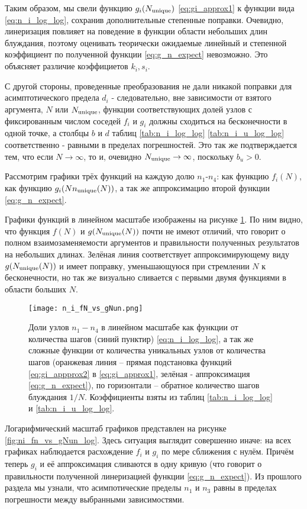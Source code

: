 Таким образом, мы свели функцию $g_i(N_{\textup{unique}})$ \eqref{eq:gi_approx1} к функции вида \eqref{eq:n_i_log_log}, сохранив дополнительные степенные поправки. 
Очевидно, линеризация повлияет на поведение в функции области небольших длин блуждания, поэтому оценивать теорически ожидаемые линейный и степенной коэффициент по полученной функции \eqref{eq:g_n_expect} невозможно.
Это объясняет различие коэффициетов $k_i, s_i$. 

С другой стороны, проведенные преобразования не дали никакой поправки для асимптотического предела $d_i$ - следовательно, вне зависимости от взятого аргумента, $N$ или $N_{\textup{unique}}$, функции соответствующих долей узлов с фиксированным числом соседей $f_i$ и $g_i$ должны сходиться на бесконечности в одной точке, а столбцы $b$ и $d$ таблиц \ref{tab:n_i_log_log} \ref{tab:n_i_u_log_log} соответственно - равными в пределах погрешностей.
Это так же подтверждается тем, что если $N \to \infty$, то и, очевидно $N_{\textup{unique}} \to \infty$, поскольку $b_u > 0$.  

Рассмотрим графики трёх функций на каждую долю $n_1$-$n_4$: как функцию $f_i(N)$, как функцию $g_i(Nn_{\textup{unique}}(N))$, а так же аппроксимацию второй функции \eqref{eq:g_n_expect}.

Графики функций в линейном масштабе изображены на рисунке \ref{fig:ni_fn_vs_gNun}. По ним видно, что функция $f(N)$ и $g(N_{\textup{unique}}(N))$ почти не имеют отличий, что говорит о полном взаимозаменяемости аргументов и правильности полученных результатов на небольших длинах. Зелёная линия соответствует аппроксимирующему виду $g(N_{\textup{unique}}(N))$ и имеет поправку, уменьшающуюся при стремлении $N$ к бесконечности, но так же визуально сливается с первыми двумя функциями в области больших $N$.

\begin{figure}
\centering
\texttt{[image: n\_i\_fN\_vs\_gNun.png]}
\label{fig:ni_fn_vs_gNun}
\caption{Доли узлов $n_1-n_4$ в линейном масштабе как функции от количества шагов (синий пунктир) \eqref{eq:n_i_log_log}, а так же сложные функции от количества уникальных узлов от количества шагов (оранжевая линия -- прямая подстановка функций  \eqref{eq:gi_appprox2} в \eqref{eq:gi_approx1}, зелёная - аппроксимация \eqref{eq:g_n_expect}), по горизонтали -- обратное количество шагов блуждания $1/N$. Коэффициенты взяты из таблиц \ref{tab:n_i_log_log} и \ref{tab:n_i_u_log_log}.}
\end{figure}

Логарифмический масштаб графиков представлен на рисунке \ref{fig:ni_fn_vs_gNun_log}. 
Здесь ситуация выглядит совершенно иначе: на всех графиках наблюдается расхождение $f_i$ и $g_i$ по мере сближения с нулём.
Причём теперь $g_i$ и её аппроксимация сливаются в одну кривую (что говорит о правильности полученной линеризацией функции \eqref{eq:g_n_expect}). 
Из прошлого раздела мы узнали, что асимпотические пределы $n_1$ и $n_3$ равны в пределах погрешности между выбранными зависимостями.

